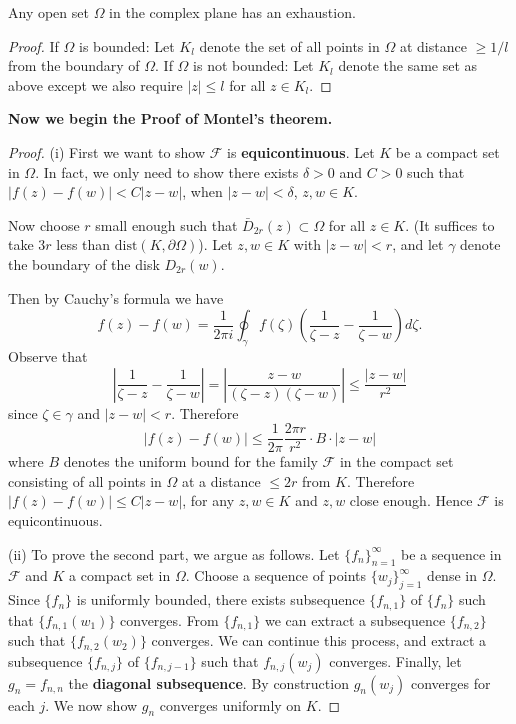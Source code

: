 \documentclass{article}
\begin{document}
\begin{lemma}
Any open set $\Omega$ in the complex plane has an exhaustion.
\end{lemma}

\begin{proof}
If $\Omega$ is bounded: Let $K_l$ denote the set of all points in $\Omega$ at distance $\ge 1/l$ from the boundary of $\Omega$.
If $\Omega$ is not bounded: Let $K_l$ denote the same set as above except we also require $|z| \le l$ for all $z \in K_l$.
\end{proof}

\textbf{Now we begin the Proof of Montel's theorem.}

\begin{proof} (i)
First we want to show $\mathcal{F}$ is \textbf{equicontinuous}.
Let $K$ be a compact set in $\Omega$.
In fact, we only need to show there exists $\delta > 0$ and $C > 0$ such that $|f(z) - f(w)| < C |z-w|$, when $|z-w| < \delta$, $z, w \in K$.

Now choose $r$ small enough such that $\bar{D}_{2r}(z) \subset \Omega$ for all $z \in K$. (It suffices to take $3r$ less than $\text{dist}(K, \partial \Omega)$).
Let $z, w \in K$ with $|z-w| < r$, and let $\gamma$ denote the boundary of the disk $D_{2r}(w)$.

Then by Cauchy's formula we have
$$f(z) - f(w) = \frac{1}{2\pi i} \oint_\gamma f(\zeta) \left( \frac{1}{\zeta - z} - \frac{1}{\zeta - w} \right) d\zeta.$$
Observe that
$$\left| \frac{1}{\zeta - z} - \frac{1}{\zeta - w} \right| = \left| \frac{z - w}{(\zeta - z)(\zeta - w)} \right| \le \frac{|z - w|}{r^2}$$
since $\zeta \in \gamma$ and $|z - w| < r$. Therefore
$$|f(z) - f(w)| \le \frac{1}{2\pi} \frac{2\pi r}{r^2} \cdot B \cdot |z - w|$$
where $B$ denotes the uniform bound for the family $\mathcal{F}$ in the compact set consisting of all points in $\Omega$ at a distance $\le 2r$ from $K$. Therefore $|f(z) - f(w)| \le C |z - w|$, for any $z, w \in K$ and $z, w$ close enough. Hence $\mathcal{F}$ is equicontinuous.

(ii) To prove the second part, we argue as follows.
Let $\{f_n\}_{n=1}^\infty$ be a sequence in $\mathcal{F}$ and $K$ a compact set in $\Omega$.
Choose a sequence of points $\{w_j\}_{j=1}^\infty$ dense in $\Omega$. Since $\{f_n\}$ is uniformly bounded, there exists subsequence $\{f_{n, 1}\}$ of $\{f_n\}$ such that $\{f_{n, 1}(w_1)\}$ converges.
From $\{f_{n, 1}\}$ we can extract a subsequence $\{f_{n, 2}\}$ such that $\{f_{n, 2}(w_2)\}$ converges. We can continue this process, and extract a subsequence $\{f_{n, j}\}$ of $\{f_{n, j-1}\}$ such that $f_{n, j}(w_j)$ converges.
Finally, let $g_n = f_{n, n}$ the \textbf{diagonal subsequence}. By construction $g_n(w_j)$ converges for each $j$. We now show $g_n$ converges uniformly on $K$.


\end{proof}
\end{document}
